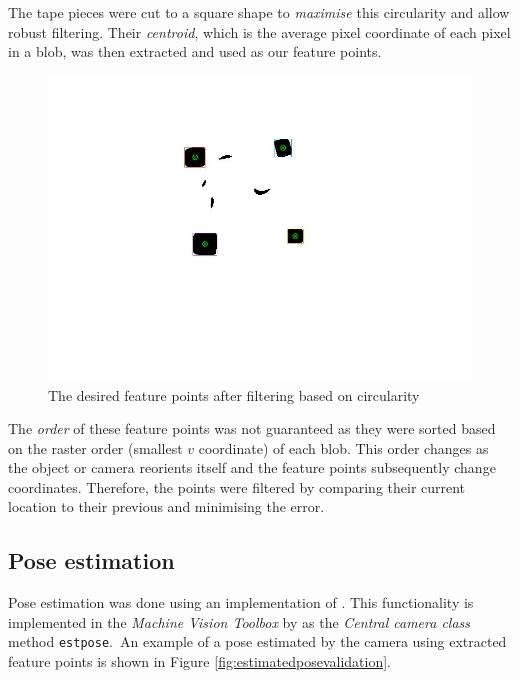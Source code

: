 \documentclass{UoNMCHA}
\numberwithin{equation}{section}
\begin{document}
The tape pieces were cut to a square shape to \textit{maximise} this circularity and allow robust filtering. Their \textit{centroid}, which is the average pixel coordinate of each pixel in a blob, was then extracted and used as our feature points. 
\begin{figure}[H]
	\begin{center}
		\includegraphics[width=.7\linewidth]{Figures/targetobjectworkspaceblobs}
		\caption{The desired feature points after filtering based on circularity}
	\end{center}
\end{figure}

The \textit{order} of these feature points was not guaranteed as they were sorted based on the raster order (smallest $v$ coordinate) of each blob. This order changes as the object or camera reorients itself and the feature points subsequently change coordinates. Therefore, the points were filtered by comparing  their current location to their previous and minimising the error. 

\subsection{Pose estimation}\label{Pose estimation}

Pose estimation was done using an implementation of \cite{ke2017efficient}. This functionality is implemented in the \textit{Machine Vision Toolbox} by \cite{corke2017robotics} as the \textit{Central camera class} method \texttt{estpose}.\ An example of a pose estimated by the camera using extracted feature points is shown in Figure \ref{fig:estimatedposevalidation}.
\end{document}
